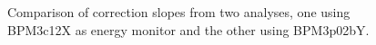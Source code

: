 \begin{figure}[ht]

\centering
{}
\caption{Comparison of correction slopes from two analyses, one using BPM3c12X as energy monitor and the other using BPM3p02bY.}
\label{fig:compton_bpm_slopes}
\end{figure}

